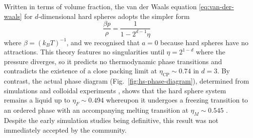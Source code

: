 \documentclass[11pt,twoside]{report}
\begin{document}
Written in terms of volume fraction, the van der Waals equation \eqref{eq:van-der-waals} for $d$-dimensional hard spheres adopts the simpler form%
\begin{equation}\label{eq:van-der-waals-hs}
  \frac{\beta p}{\rho} = \frac{1}{1 - 2^{d-1} \eta}
\end{equation}
where $\beta = (k_B T)^{-1}$, and we recognised that $a = 0$ because hard spheres have no attractions.
This theory features no singularities until $\eta = 2^{1-d}$ where the pressure diverges, so it predicts no thermodynamic phase transitions and contradicts the existence of a close packing limit at $\eta_\mathrm{CP} \sim 0.74$ in $d=3$.
By contrast, the actual phase diagram (Fig.\ \ref{fig:hs-phase-diagram}), determined from simulations \cite{AlderJCP1957,WoodJCP1957,HooverJCP1968} and colloidal experiments \cite{PuseyN1986}, shows that the hard sphere system remains a liquid%
up to $\eta_F \sim 0.494$ whereupon it undergoes a freezing transition to an ordered phase with an accompanying melting transition at $\eta_M \sim 0.545$ \cite{HooverJCP1968}.
Despite the early simulation studies being definitive, this result was not immediately accepted by the community.
\end{document}
